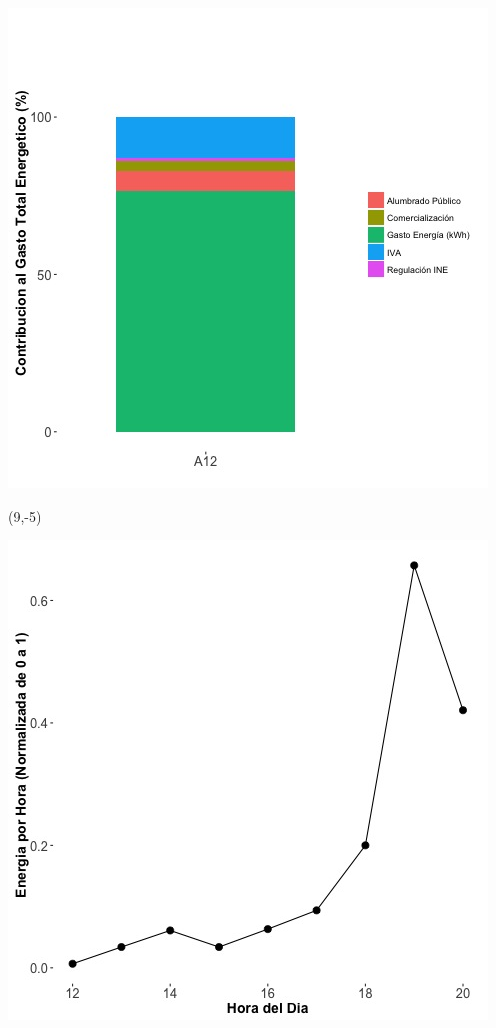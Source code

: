 \documentclass{article}\usepackage[]{graphicx}\usepackage[]{color}
\newenvironment{knitrout}{}{} %
\begin{document}
\begin{knitrout}
\color{fgcolor}
\includegraphics[scale=0.65]{figure/A12_costvars_plot.jpg} 
\end{knitrout}

 \begin{textblock}{1}(9,-5)
\begin{minipage}{20em}
\begingroup

\endgroup
\end{minipage}
\end{textblock}

\begin{knitrout}
\color{fgcolor}
\includegraphics[scale=0.65]{figure/A12_plot_norm_median} 
\end{knitrout}
\end{document}

